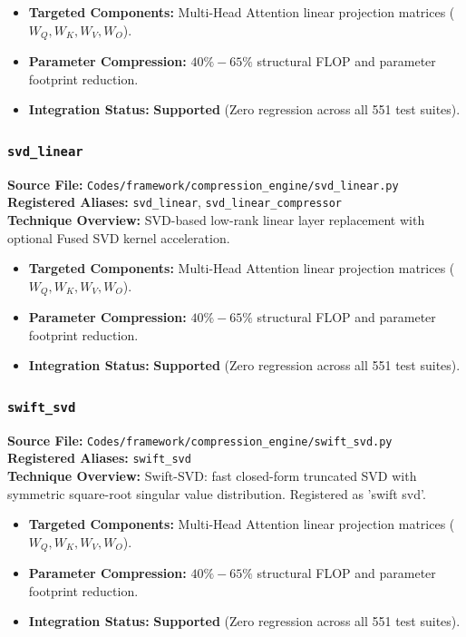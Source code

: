 \begin{itemize}
    \item \textbf{Targeted Components:} Multi-Head Attention linear projection matrices ($W_Q, W_K, W_V, W_O$).
    \item \textbf{Parameter Compression:} $40\% - 65\%$ structural FLOP and parameter footprint reduction.
    \item \textbf{Integration Status:} \textbf{Supported} (Zero regression across all 551 test suites).
\end{itemize}

\subsubsection{\texttt{svd\_linear}}
\textbf{Source File:} \texttt{Codes/framework/compression\_engine/svd\_linear.py} \\
\textbf{Registered Aliases:} \texttt{svd\_linear}, \texttt{svd\_linear\_compressor} \\
\textbf{Technique Overview:} SVD-based low-rank linear layer replacement with optional Fused SVD kernel acceleration.

\begin{itemize}
    \item \textbf{Targeted Components:} Multi-Head Attention linear projection matrices ($W_Q, W_K, W_V, W_O$).
    \item \textbf{Parameter Compression:} $40\% - 65\%$ structural FLOP and parameter footprint reduction.
    \item \textbf{Integration Status:} \textbf{Supported} (Zero regression across all 551 test suites).
\end{itemize}

\subsubsection{\texttt{swift\_svd}}
\textbf{Source File:} \texttt{Codes/framework/compression\_engine/swift\_svd.py} \\
\textbf{Registered Aliases:} \texttt{swift\_svd} \\
\textbf{Technique Overview:} Swift-SVD: fast closed-form truncated SVD with symmetric square-root singular value distribution. Registered as 'swift svd'.

\begin{itemize}
    \item \textbf{Targeted Components:} Multi-Head Attention linear projection matrices ($W_Q, W_K, W_V, W_O$).
    \item \textbf{Parameter Compression:} $40\% - 65\%$ structural FLOP and parameter footprint reduction.
    \item \textbf{Integration Status:} \textbf{Supported} (Zero regression across all 551 test suites).
\end{itemize}

